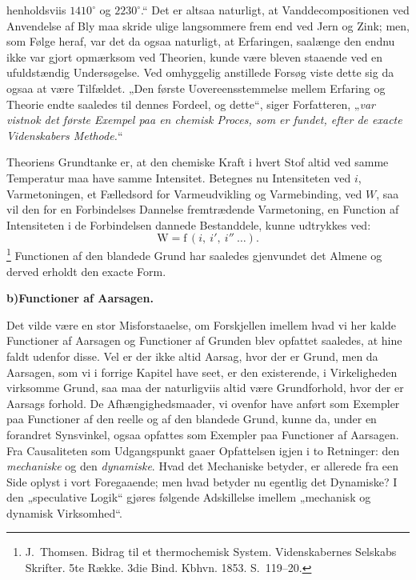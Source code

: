 \documentclass[12pt]{book}
\newcommand{\opage}[1]{\marginnote{\footnotesize\textit{[#1]}}}
\newcommand{\apage}[1]{\marginnote{\footnotesize\textit{[#1]}}}
\begin{document}
henholdsviis $1410^{\circ}$ og $2230^{\circ}$.“%
\opage{329} Det er altsaa naturligt, at Vanddecompositionen ved Anvendelse af Bly maa skride ulige
langsommere frem end ved Jern og Zink; men, som Følge heraf, var det da ogsaa
naturligt, at Erfaringen, saalænge den endnu ikke var gjort opmærksom ved Theorien,
kunde være bleven staaende ved en ufuldstændig Undersøgelse. Ved omhyggelig anstillede
Forsøg viste dette sig da ogsaa at være Tilfældet. „Den første Uovereensstemmelse
mellem Erfaring og Theorie endte saaledes til dennes Fordeel, og dette“, siger
Forfatteren, „\emph{var vistnok det første Exempel paa en chemisk Proces, som er
fundet, efter de exacte Videnskabers Methode.}“

Theoriens Grundtanke er, at den chemiske Kraft i hvert Stof altid ved samme Temperatur
maa have samme Intensitet. Betegnes nu Intensiteten ved $i$, Varmetoningen, et
Fælledsord for Varmeudvikling og Varmebinding, ved $W$, saa vil den for en
Forbindelses Dannelse fremtrædende Varmetoning, en Function af Intensiteten i de
Forbindelsen dannede Bestanddele, kunne udtrykkes ved:
\[ \mathrm{W} = \mathrm{f}\,(i,\ i',\ i''\ \ldots). \]%
\footnote{J.\ Thomsen. Bidrag til et thermochemisk System. Videnskabernes Selskabs
  Skrifter. 5te Række. 3die Bind. Kbhvn. 1853. S.~119--20.}
Functionen af den blandede Grund har saaledes gjenvundet det Almene og derved erholdt
den exacte Form.

\begin{center}{\bfseries b)\quad Functioner af Aarsagen.}\end{center}

Det vilde være en stor Misforstaaelse, om Forskjellen imellem hvad vi her kalde
Functioner af Aarsagen og Functioner af Grunden blev opfattet saaledes, at hine faldt
udenfor disse. Vel er der ikke altid Aarsag, hvor der er Grund, men da Aarsagen, som
vi i forrige Kapitel have seet, er den existerende, i Virkeligheden virksomme Grund,
saa maa der naturligviis altid være Grundforhold, hvor der er Aarsags\-%
 \apage{330}forhold. De Afhængighedsmaader, vi ovenfor have anført som Exempler paa Functioner af
den reelle og af den blandede Grund, kunne da, under en forandret Synsvinkel, ogsaa
opfattes som Exempler paa Functioner af Aarsagen. Fra Causaliteten som Udgangspunkt
gaaer Opfattelsen igjen i to Retninger: den \emph{mechaniske} og den \emph{dynamiske}.
Hvad det Mechaniske betyder, er allerede fra een Side oplyst i vort Foregaaende; men
hvad betyder nu egentlig det Dynamiske? I den „speculative Logik“ gjøres følgende
Adskillelse imellem „mechanisk og dynamisk Virksomhed“.
\end{document}
